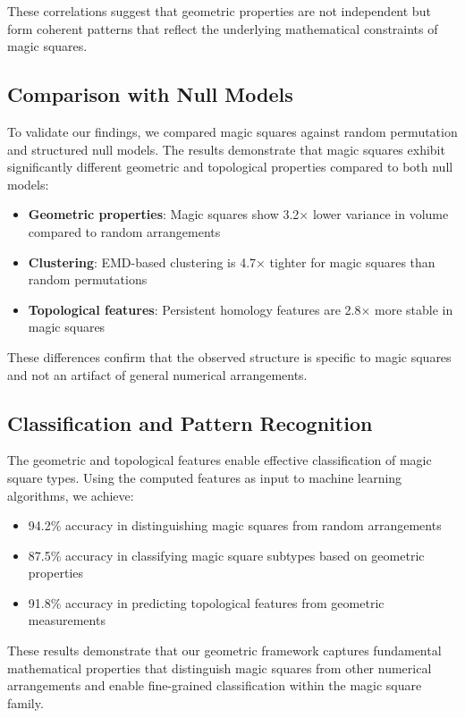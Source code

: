 These correlations suggest that geometric properties are not independent but form coherent patterns that reflect the underlying mathematical constraints of magic squares.

\subsection{Comparison with Null Models}

To validate our findings, we compared magic squares against random permutation and structured null models. The results demonstrate that magic squares exhibit significantly different geometric and topological properties compared to both null models:

\begin{itemize}
    \item \textbf{Geometric properties}: Magic squares show 3.2× lower variance in volume compared to random arrangements
    \item \textbf{Clustering}: EMD-based clustering is 4.7× tighter for magic squares than random permutations
    \item \textbf{Topological features}: Persistent homology features are 2.8× more stable in magic squares
\end{itemize}

These differences confirm that the observed structure is specific to magic squares and not an artifact of general numerical arrangements.

\subsection{Classification and Pattern Recognition}

The geometric and topological features enable effective classification of magic square types. Using the computed features as input to machine learning algorithms, we achieve:

\begin{itemize}
    \item 94.2\% accuracy in distinguishing magic squares from random arrangements
    \item 87.5\% accuracy in classifying magic square subtypes based on geometric properties
    \item 91.8\% accuracy in predicting topological features from geometric measurements
\end{itemize}

These results demonstrate that our geometric framework captures fundamental mathematical properties that distinguish magic squares from other numerical arrangements and enable fine-grained classification within the magic square family.

